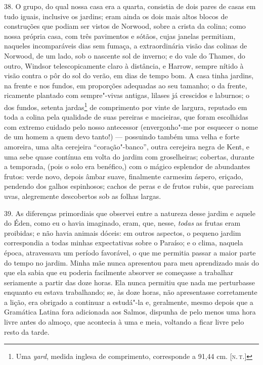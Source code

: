 38. O grupo, do qual nossa casa era a quarta, consistia de dois pares de
casas em tudo iguais, inclusive os jardins; eram ainda os dois mais
altos blocos de construções que podiam ser vistos de Norwood, sobre a
crista da colina; como nossa própria casa, com três pavimentos e sótãos,
cujas janelas permitiam, naqueles incomparáveis dias sem fumaça, a
extraordinária visão das colinas de Norwood, de um lado, sob o nascente
sol de inverno; e do vale do Thames, do outro, Windsor telescopicamente
claro à distância, e Harrow, sempre nítido à visão contra o pôr do sol
do verão, em dias de tempo bom. A casa tinha jardins, na frente e nos
fundos, em proporções adequadas ao seu tamanho; o da frente, ricamente
plantado com sempre"-vivas antigas, lilases já crescidos e laburnos; o
dos fundos, setenta jardas\footnote{Uma \emph{yard}, medida inglesa de
  comprimento, corresponde a 91,44 cm. {[}\textsc{n.\,t.}{]}} de comprimento
por vinte de largura, reputado em toda a colina pela qualidade de suas
pereiras e macieiras, que foram escolhidas com extremo cuidado pelo
nosso antecessor (envergonho"-me por esquecer o nome de um homem a quem
devo tanto!) --- possuindo também uma velha e forte amoreira, uma alta
cerejeira ``coração"-banco'', outra cerejeira negra de Kent, e uma sebe
quase contínua em volta do jardim com groselheiras; cobertas, durante a
temporada, (pois o solo era benéfico,) com o mágico esplendor de
abundantes frutos: verde novo, depois âmbar suave, finalmente carmesim
áspero, eriçado, pendendo dos galhos espinhosos; cachos de peras e de
frutos rubis, que pareciam uvas, alegremente descobertos sob as folhas
largas.

39. As diferenças primordiais que observei entre a natureza desse jardim
e aquele do Éden, como eu o havia imaginado, eram, que, nesse,
\emph{todas} as frutas eram proibidas; e não havia animais dóceis: em
outros aspectos, o pequeno jardim correspondia a todas minhas
expectativas sobre o Paraíso; e o clima, naquela época, atravessava um
período favorável, o que me permitia passar a maior parte do tempo no
jardim. Minha mãe nunca apresentou para meu aprendizado mais do que ela
sabia que eu poderia facilmente absorver se começasse a trabalhar
seriamente a partir das doze horas. Ela nunca permitiu que nada me
perturbasse enquanto eu estava trabalhando; se, às doze horas, não
apresentasse corretamente a lição, era obrigado a continuar a estudá"-la
e, geralmente, mesmo depois que a Gramática Latina fora adicionada aos
Salmos, dispunha de pelo menos uma hora livre antes do almoço, que
acontecia à uma e meia, voltando a ficar livre pelo resto da tarde.

